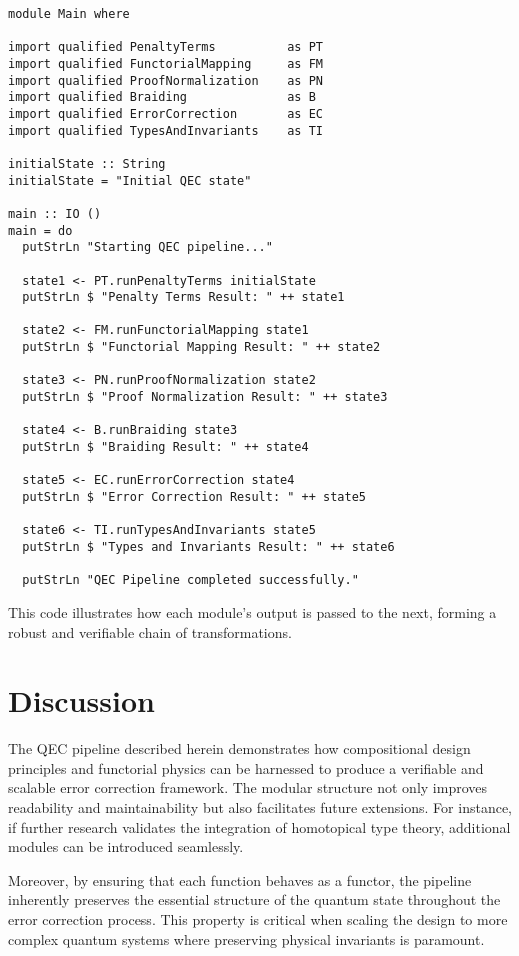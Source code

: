 \documentclass[11pt]{article}
\begin{document}
\begin{verbatim}
module Main where

import qualified PenaltyTerms          as PT
import qualified FunctorialMapping     as FM
import qualified ProofNormalization    as PN
import qualified Braiding              as B
import qualified ErrorCorrection       as EC
import qualified TypesAndInvariants    as TI

initialState :: String
initialState = "Initial QEC state"

main :: IO ()
main = do
  putStrLn "Starting QEC pipeline..."
  
  state1 <- PT.runPenaltyTerms initialState
  putStrLn $ "Penalty Terms Result: " ++ state1
  
  state2 <- FM.runFunctorialMapping state1
  putStrLn $ "Functorial Mapping Result: " ++ state2
  
  state3 <- PN.runProofNormalization state2
  putStrLn $ "Proof Normalization Result: " ++ state3
  
  state4 <- B.runBraiding state3
  putStrLn $ "Braiding Result: " ++ state4
  
  state5 <- EC.runErrorCorrection state4
  putStrLn $ "Error Correction Result: " ++ state5
  
  state6 <- TI.runTypesAndInvariants state5
  putStrLn $ "Types and Invariants Result: " ++ state6
  
  putStrLn "QEC Pipeline completed successfully."
\end{verbatim}

This code illustrates how each module’s output is passed to the next, forming a robust and verifiable chain of transformations.

\section{Discussion}
The QEC pipeline described herein demonstrates how compositional design principles and functorial physics can be harnessed to produce a verifiable and scalable error correction framework. The modular structure not only improves readability and maintainability but also facilitates future extensions. For instance, if further research validates the integration of homotopical type theory, additional modules can be introduced seamlessly.

Moreover, by ensuring that each function behaves as a functor, the pipeline inherently preserves the essential structure of the quantum state throughout the error correction process. This property is critical when scaling the design to more complex quantum systems where preserving physical invariants is paramount.
\end{document}
